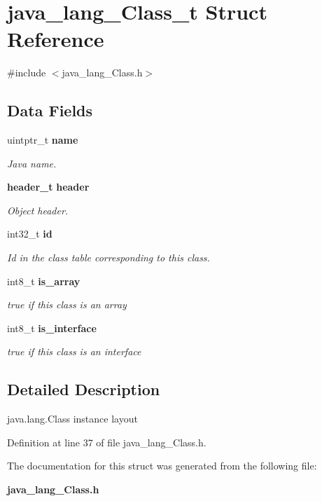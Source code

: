 \section{java\_\-lang\_\-Class\_\-t Struct Reference}
\label{structjava__lang___class__t}


{\ttfamily \#include $<$java\_\-lang\_\-Class.h$>$}

\subsection*{Data Fields}
\begin{DoxyCompactItemize}
\item 
uintptr\_\-t {\bf name}\label{structjava__lang___class__t_a64ad1895677aafb69ad7835ff82a90aa}

\begin{DoxyCompactList}\small\item\em Java name. \item\end{DoxyCompactList}\item 
{\bf header\_\-t} {\bf header}\label{structjava__lang___class__t_afbe0d8019bd34c877c7712f079c07e06}

\begin{DoxyCompactList}\small\item\em Object header. \item\end{DoxyCompactList}\item 
int32\_\-t {\bf id}\label{structjava__lang___class__t_a09429faacb6c337e40f72d0701c52e9b}

\begin{DoxyCompactList}\small\item\em Id in the class table corresponding to this class. \item\end{DoxyCompactList}\item 
int8\_\-t {\bf is\_\-array}\label{structjava__lang___class__t_ab71891322ee49f7fe4e2969bb7cfcc43}

\begin{DoxyCompactList}\small\item\em true if this class is an array \item\end{DoxyCompactList}\item 
int8\_\-t {\bf is\_\-interface}\label{structjava__lang___class__t_a59b5616d8be20f900491b45dd2fd693f}

\begin{DoxyCompactList}\small\item\em true if this class is an interface \item\end{DoxyCompactList}\end{DoxyCompactItemize}


\subsection{Detailed Description}
java.lang.Class instance layout 

Definition at line 37 of file java\_\-lang\_\-Class.h.



The documentation for this struct was generated from the following file:\begin{DoxyCompactItemize}
\item 
{\bf java\_\-lang\_\-Class.h}\end{DoxyCompactItemize}
